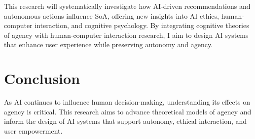 \documentclass[12pt]{article}
\begin{document}
This research will systematically investigate how AI-driven recommendations and autonomous actions influence SoA, offering new insights into AI ethics, human-computer interaction, and cognitive psychology. By integrating cognitive theories of agency with human-computer interaction research, I aim to design AI systems that enhance user experience while preserving autonomy and agency.

\section{Conclusion}

As AI continues to influence human decision-making, understanding its effects on agency is critical. This research aims to advance theoretical models of agency and inform the design of AI systems that support autonomy, ethical interaction, and user empowerment.


\end{document}
